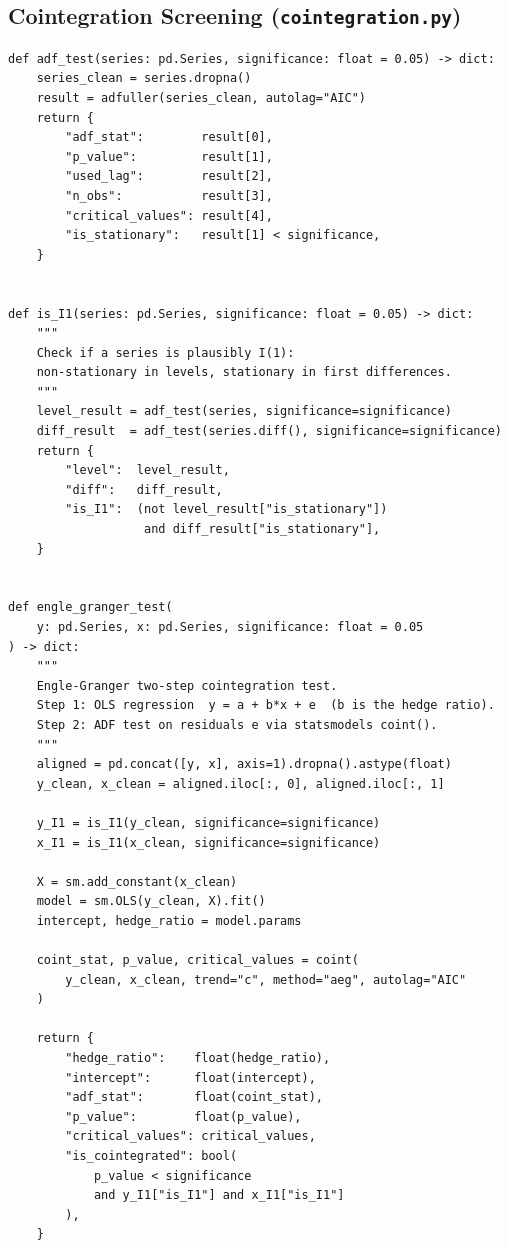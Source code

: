 \documentclass[a4paper]{report}
\begin{document}
\subsection{Cointegration Screening (\texttt{cointegration.py})}

\begin{Verbatim}[fontsize=\footnotesize, baselinestretch=0.85]
def adf_test(series: pd.Series, significance: float = 0.05) -> dict:
    series_clean = series.dropna()
    result = adfuller(series_clean, autolag="AIC")
    return {
        "adf_stat":        result[0],
        "p_value":         result[1],
        "used_lag":        result[2],
        "n_obs":           result[3],
        "critical_values": result[4],
        "is_stationary":   result[1] < significance,
    }


def is_I1(series: pd.Series, significance: float = 0.05) -> dict:
    """
    Check if a series is plausibly I(1):
    non-stationary in levels, stationary in first differences.
    """
    level_result = adf_test(series, significance=significance)
    diff_result  = adf_test(series.diff(), significance=significance)
    return {
        "level":  level_result,
        "diff":   diff_result,
        "is_I1":  (not level_result["is_stationary"])
                   and diff_result["is_stationary"],
    }


def engle_granger_test(
    y: pd.Series, x: pd.Series, significance: float = 0.05
) -> dict:
    """
    Engle-Granger two-step cointegration test.
    Step 1: OLS regression  y = a + b*x + e  (b is the hedge ratio).
    Step 2: ADF test on residuals e via statsmodels coint().
    """
    aligned = pd.concat([y, x], axis=1).dropna().astype(float)
    y_clean, x_clean = aligned.iloc[:, 0], aligned.iloc[:, 1]

    y_I1 = is_I1(y_clean, significance=significance)
    x_I1 = is_I1(x_clean, significance=significance)

    X = sm.add_constant(x_clean)
    model = sm.OLS(y_clean, X).fit()
    intercept, hedge_ratio = model.params

    coint_stat, p_value, critical_values = coint(
        y_clean, x_clean, trend="c", method="aeg", autolag="AIC"
    )

    return {
        "hedge_ratio":    float(hedge_ratio),
        "intercept":      float(intercept),
        "adf_stat":       float(coint_stat),
        "p_value":        float(p_value),
        "critical_values": critical_values,
        "is_cointegrated": bool(
            p_value < significance
            and y_I1["is_I1"] and x_I1["is_I1"]
        ),
    }



\end{Verbatim}
\end{document}
